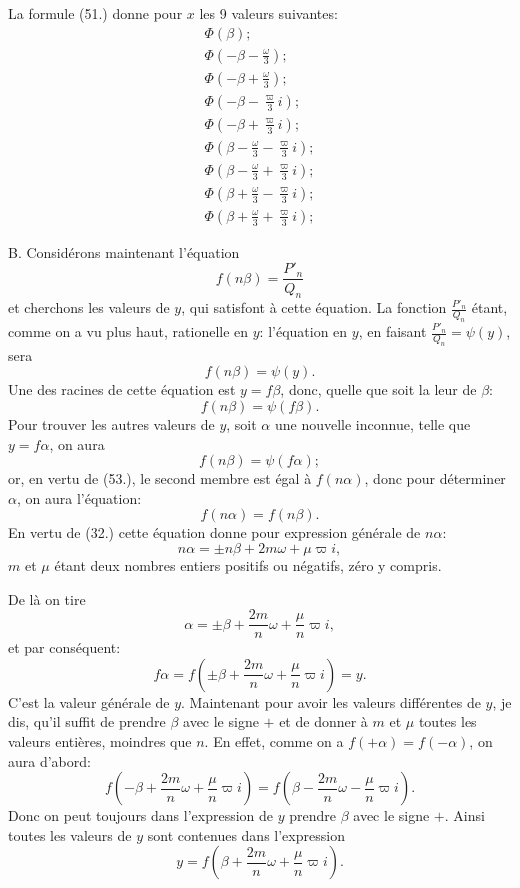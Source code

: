 \documentclass{article}
\begin{document}
La formule (51.) donne pour $x$ les 9 valeurs suivantes:
\[ \begin{gathered} \Phi(\beta);\\ \Phi\left(-\beta-\frac{\omega}{3}\right);\\ \Phi\left(-\beta+\frac{\omega}{3}\right);\\ \Phi\left(-\beta-\frac{\varpi}{3}i\right);\\ \Phi\left(-\beta+\frac{\varpi}{3}i\right);\\ \Phi\left(\beta-\frac{\omega}{3}-\frac{\varpi}{3}i\right);\\ \Phi\left(\beta-\frac{\omega}{3}+\frac{\varpi}{3}i\right);\\ \Phi\left(\beta+\frac{\omega}{3}-\frac{\varpi}{3}i\right);\\ \Phi\left(\beta+\frac{\omega}{3}+\frac{\varpi}{3}i\right); \end{gathered} \]


B. Considérons maintenant l'équation
\[ f(n\beta)=\frac{P'_n}{Q_n} \tag{52.} \]
et cherchons les valeurs de $y$, qui satisfont à cette équation. La fonction $\frac{P'_n}{Q_n}$ étant, comme on a vu plus haut, rationelle en $y$: l'équation en $y$, en faisant $\frac{P'_n}{Q_n}=\psi(y)$, sera
\[ f(n\beta)=\psi(y). \]
Une des racines de cette équation est $y=f\beta$, donc, quelle que soit la leur de $\beta$:
\[ f(n\beta)=\psi(f\beta). \tag{53.} \]
Pour trouver les autres valeurs de $y$, soit $\alpha$ une nouvelle inconnue, telle que $y=f\alpha$, on aura
\[ f(n\beta)=\psi(f\alpha); \]
or, en vertu de (53.), le second membre est égal à $f(n\alpha)$, donc pour déterminer $\alpha$, on aura l'équation:
\[ f(n\alpha)=f(n\beta). \]
En vertu de (32.) cette équation donne pour expression générale de $n\alpha$:
\[ n\alpha=\pm n\beta+2m\omega+\mu\varpi i, \]
$m$ et $\mu$ étant deux nombres entiers positifs ou négatifs, zéro y compris.

De là on tire
\[ \alpha=\pm\beta+\frac{2m}{n}\omega+\frac{\mu}{n}\varpi i, \]
et par conséquent:
\[ f\alpha=f\left(\pm\beta+\frac{2m}{n}\omega+\frac{\mu}{n}\varpi i\right)=y. \]
C'est la valeur générale de $y$. Maintenant pour avoir les valeurs différentes de $y$, je dis, qu'il suffit de prendre $\beta$ avec le signe $+$ et de donner à $m$ et $\mu$ toutes les valeurs entières, moindres que $n$. En effet, comme on a $f(+\alpha)=f(-\alpha)$, on aura d'abord:
\[ f\left(-\beta+\frac{2m}{n}\omega+\frac{\mu}{n}\varpi i\right)=f\left(\beta-\frac{2m}{n}\omega-\frac{\mu}{n}\varpi i\right). \]
Donc on peut toujours dans l'expression de $y$ prendre $\beta$ avec le signe $+$. Ainsi toutes les valeurs de $y$ sont contenues dans l'expression
\[ y=f\left(\beta+\frac{2m}{n}\omega+\frac{\mu}{n}\varpi i\right). \tag{54.} \]
\end{document}
